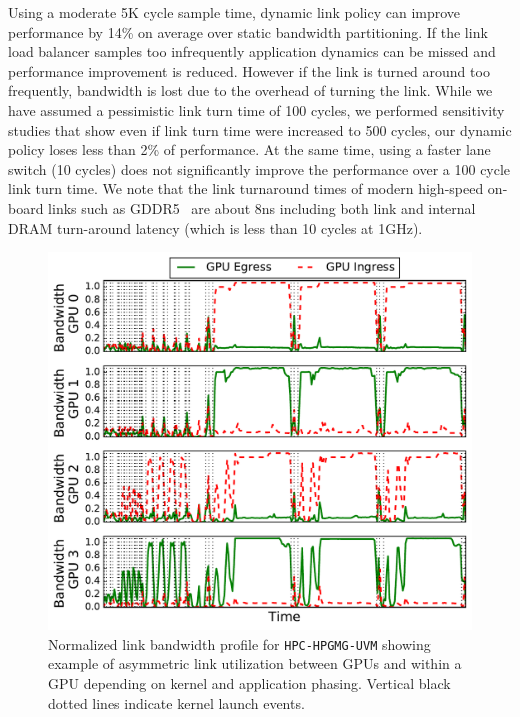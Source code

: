 Using a moderate 5K cycle sample time, dynamic link policy can improve performance
by 14\% on average over static bandwidth partitioning. If the link load
balancer samples too infrequently application dynamics can be missed
and performance improvement is reduced. However if the link is turned around
too frequently, bandwidth is lost due to the overhead of turning the link.
While we have assumed a pessimistic link turn time of 100 cycles, we performed
sensitivity studies that show even if link turn time were increased to 500
cycles, our dynamic policy loses less than 2\% of performance. 
At the same time, using a faster lane switch (10 cycles) does not
significantly improve the performance over a 100 cycle link turn time.
We note that the link
turnaround times of modern high-speed on-board links such as
GDDR5~\cite{hynixgddr51Gb} are about 8ns including both link and internal 
DRAM turn-around latency (which is less than 10 cycles at 1GHz).

\begin{figure}[t]
    \centering
    
\includegraphics[width=1.0\columnwidth]{figures/bw_profile_HPGMG_UVM_base.pdf}
    \caption{Normalized link bandwidth profile for \texttt{HPC-HPGMG-UVM} 
showing example of asymmetric link utilization between GPUs and within a GPU depending on 
kernel and application phasing. Vertical black dotted lines indicate kernel launch events.}
    \label{fig:link-motivation}
    \vspace{-.2in}
\end{figure}

